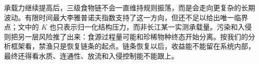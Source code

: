 承载力继续提高后，三级食物链不会一直维持规则振荡，而是会走向更复杂的长期波动。有限时间最大李雅普诺夫指数支持了这一方向，但还不足以给出唯一临界点；文中的 $K$ 也只表示归一化结构压力，而非长江某一实测承载量。污染和入侵则把另一层风险推了出来：食源过程量可能和珍稀物种终态开始分离。按我们的分析框架看，禁渔只是恢复链条的起点。链条恢复以后，收益能不能留在系统内部，最终还得看水质、连通性、放流和入侵控制能不能跟上。
